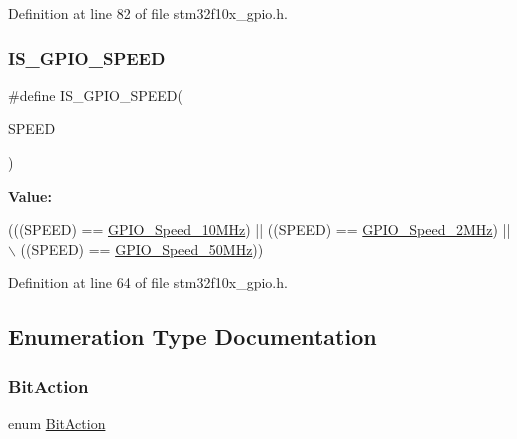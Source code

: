 Definition at line 82 of file stm32f10x\+\_\+gpio.\+h.

\mbox{\label{group___g_p_i_o___exported___types_ga888e1f951df2fe9dbf827528051a3a56}} 
\subsubsection{\texorpdfstring{I\+S\+\_\+\+G\+P\+I\+O\+\_\+\+S\+P\+E\+ED}{IS\_GPIO\_SPEED}}
{\footnotesize\ttfamily \#define I\+S\+\_\+\+G\+P\+I\+O\+\_\+\+S\+P\+E\+ED(\begin{DoxyParamCaption}\item[{}]{S\+P\+E\+ED }\end{DoxyParamCaption})}

{\bfseries Value\+:}
\begin{DoxyCode}
(((SPEED) == \hyperlink{group___g_p_i_o___exported___types_gga062ad92b67b4a1f301c161022cf3ba8ea8c567e4b0186e3708cd7020c13da6439}{GPIO\_Speed\_10MHz}) || ((SPEED) == \hyperlink{group___g_p_i_o___exported___types_gga062ad92b67b4a1f301c161022cf3ba8ea9bff9e174639332007c914483361be18}{GPIO\_Speed\_2MHz}) || \(\backslash\)
                              ((SPEED) == \hyperlink{group___g_p_i_o___exported___types_gga062ad92b67b4a1f301c161022cf3ba8ea9c47db10456202ac05134b12738ce581}{GPIO\_Speed\_50MHz}))
\end{DoxyCode}


Definition at line 64 of file stm32f10x\+\_\+gpio.\+h.



\subsection{Enumeration Type Documentation}
\mbox{\label{group___g_p_i_o___exported___types_ga176130b21c0e719121470a6042d4cf19}} 
\subsubsection{\texorpdfstring{Bit\+Action}{BitAction}}
{\footnotesize\ttfamily enum \hyperlink{group___g_p_i_o___exported___types_ga176130b21c0e719121470a6042d4cf19}{Bit\+Action}}



